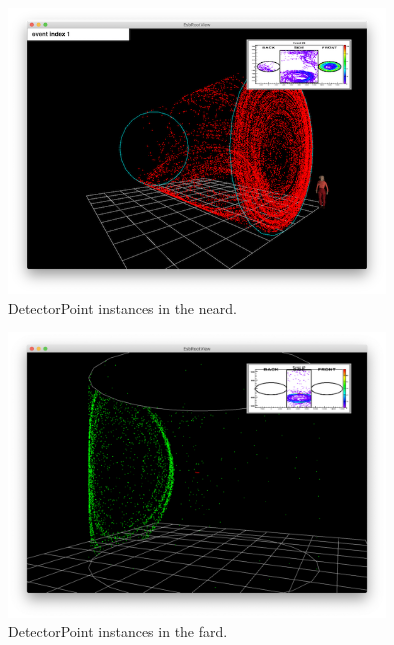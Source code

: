 \documentclass{webofc}
\begin{document}
\begin{figure}[ht]
\centering
\includegraphics[width=10cm,clip]{layout_event_1}
\caption{DetectorPoint instances in the neard.}
\label{fig-layout-event-1}
\end{figure}

\begin{figure}[ht]
\centering
\includegraphics[width=10cm,clip]{fard_setup}
\caption{DetectorPoint instances in the fard.}
\label{fig-fard-setup}
\end{figure}
\end{document}
